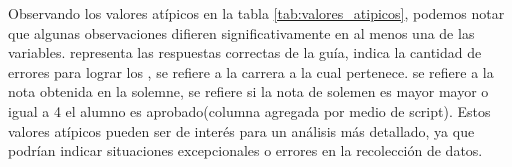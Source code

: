 Observando los valores atípicos en la tabla \ref{tab:valores_atipicos}, podemos notar que algunas observaciones difieren significativamente en al menos una de las variables.  representa las respuestas correctas de la guía,  indica la cantidad de errores para lograr los ,  se refiere a la carrera a la cual pertenece.  se refiere a la nota obtenida en la solemne,  se refiere si la nota de solemen es mayor mayor o igual a 4 el alumno es aprobado(columna agregada por medio de script). Estos valores atípicos pueden ser de interés para un análisis más detallado, ya que podrían indicar situaciones excepcionales o errores en la recolección de datos.